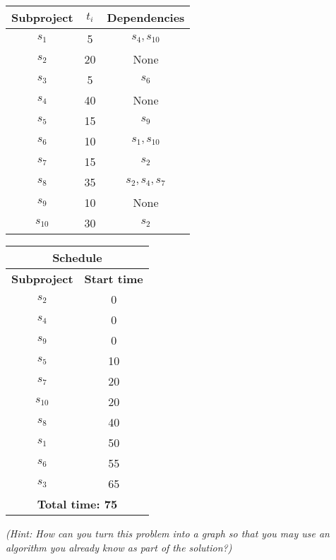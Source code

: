 \documentclass[letterpaper,11pt]{article}
\begin{document}
\begin{center}
\begin{tabular}{ |c |c |c |}
\hline
{\bf Subproject} & {\bf $t_i$} & {\bf Dependencies} \\ 
\hline
$s_1$ & 5 & $s_4, s_{10}$ \\ 
 \hline 
$s_2$ & 20 & None \\
 \hline
$s_3$ & 5 & $s_6$\\ 
 \hline  
$s_4$ & 40 & None \\ 
 \hline 
$s_5$ & 15 & $s_9$ \\
 \hline
$s_6$ & 10 & $s_1, s_{10}$\\ 
 \hline  
$s_7$ & 15 & $s_2$ \\ 
 \hline 
$s_8$ & 35 & $s_2, s_4, s_7$ \\
 \hline
$s_9$ & 10 & None\\ 
 \hline  
$s_{10}$ & 30 & $s_2$ \\ 
 \hline 
\end{tabular}
\quad
\begin{tabular}{ |c |c |}
\hline
\multicolumn{2}{|c|}{\bf Schedule}\\
\hline
{\bf Subproject} & {\bf Start time}\\ 
\hline
$s_2$ & 0 \\ 
 \hline 
$s_4$ & 0  \\
 \hline
$s_9$ & 0 \\ 
 \hline  
$s_5$ & 10  \\ 
 \hline 
$s_7$ & 20  \\
 \hline
$s_{10}$ & 20 \\ 
 \hline  
$s_8$ & 40  \\ 
 \hline 
$s_1$ & 50  \\
 \hline
$s_6$ & 55 \\ 
 \hline  
$s_3$ & 65  \\ 
 \hline 
 \multicolumn{2}{|c|}{\bf Total time: 75}\\
 \hline
\end{tabular}
\end{center}


\emph{(Hint: How can you turn this problem into a graph so that you may use an algorithm you already know as part of the solution?)}
\end{document}
